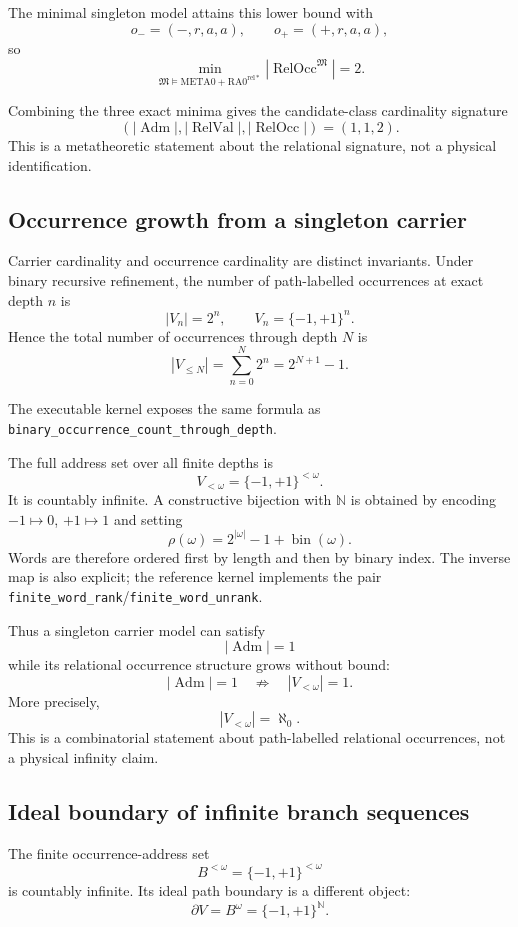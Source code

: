\documentclass[11pt]{article}
\newcommand{\codeid}[1]{\nolinkurl{#1}}
\begin{document}
The minimal singleton model attains this lower bound with
\[
o_-=(-,r,a,a),
\qquad
o_+=(+,r,a,a),
\]
so
\[
\boxed{
\min_{\mathfrak M\models
\mathrm{META0}+\mathrm{RA0}^{\mathrm{rel}*}}
|\operatorname{RelOcc}^{\mathfrak M}|
=
2.
}
\]

Combining the three exact minima gives the candidate-class cardinality
signature
\[
\boxed{
\left(
|\operatorname{Adm}|,
|\operatorname{RelVal}|,
|\operatorname{RelOcc}|
\right)
=
(1,1,2).
}
\]
This is a metatheoretic statement about the relational signature, not a
physical identification.

\subsection{Occurrence growth from a singleton carrier}

Carrier cardinality and occurrence cardinality are distinct invariants. Under
binary recursive refinement, the number of path-labelled occurrences at
exact depth \(n\) is
\[
|V_n|=2^n,
\qquad
V_n=\{-1,+1\}^{n}.
\]
Hence the total number of occurrences through depth \(N\) is
\[
\boxed{
|V_{\le N}|
=
\sum_{n=0}^{N}2^n
=
2^{N+1}-1.
}
\]

The executable kernel exposes the same formula as
\codeid{binary_occurrence_count_through_depth}.

The full address set over all finite depths is
\[
V_{<\omega}
=
\{-1,+1\}^{<\omega}.
\]
It is countably infinite. A constructive bijection with \(\mathbb N\) is
obtained by encoding \(-1\mapsto0\), \(+1\mapsto1\) and setting
\[
\boxed{
\rho(\omega)
=
2^{|\omega|}-1
+
\operatorname{bin}(\omega).
}
\]
Words are therefore ordered first by length and then by binary index. The
inverse map is also explicit; the reference kernel implements the pair
\texttt{finite\_word\_rank}/\texttt{finite\_word\_unrank}.

Thus a singleton carrier model can satisfy
\[
|\operatorname{Adm}|=1
\]
while its relational occurrence structure grows without bound:
\[
\boxed{
|\operatorname{Adm}|=1
\quad\not\Rightarrow\quad
|V_{<\omega}|=1.
}
\]
More precisely,
\[
|V_{<\omega}|=\aleph_0.
\]
This is a combinatorial statement about path-labelled relational occurrences,
not a physical infinity claim.

\subsection{Ideal boundary of infinite branch sequences}

The finite occurrence-address set
\[
B^{<\omega}
=
\{-1,+1\}^{<\omega}
\]
is countably infinite. Its ideal path boundary is a different object:
\[
\boxed{
\partial V
=
B^\omega
=
\{-1,+1\}^{\mathbb N}.
}
\]
\end{document}
